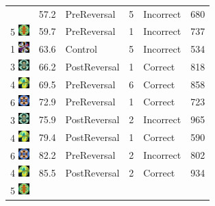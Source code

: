 \documentclass[]{article}
\begin{document}
\begin{longtable}[]{@{}lrlrll@{}}
& 57.2 & PreReversal & 5 & Incorrect & 680\tabularnewline
5
\includegraphics[width=0.16670in,height=0.16670in]{../ReversalLearning_20130621/images/abs5.jpg}
& 59.7 & PreReversal & 1 & Incorrect & 737\tabularnewline
1
\includegraphics[width=0.16670in,height=0.16670in]{../ReversalLearning_20130621/images/abs1.jpg}
& 63.6 & Control & 5 & Incorrect & 534\tabularnewline
3
\includegraphics[width=0.16670in,height=0.16670in]{../ReversalLearning_20130621/images/abs3.jpg}
& 66.2 & PostReversal & 1 & Correct & 818\tabularnewline
4
\includegraphics[width=0.16670in,height=0.16670in]{../ReversalLearning_20130621/images/abs4.jpg}
& 69.5 & PreReversal & 6 & Correct & 858\tabularnewline
6
\includegraphics[width=0.16670in,height=0.16670in]{../ReversalLearning_20130621/images/abs6.jpg}
& 72.9 & PreReversal & 1 & Correct & 723\tabularnewline
3
\includegraphics[width=0.16670in,height=0.16670in]{../ReversalLearning_20130621/images/abs3.jpg}
& 75.9 & PostReversal & 2 & Incorrect & 965\tabularnewline
4
\includegraphics[width=0.16670in,height=0.16670in]{../ReversalLearning_20130621/images/abs4.jpg}
& 79.4 & PostReversal & 1 & Correct & 590\tabularnewline
6
\includegraphics[width=0.16670in,height=0.16670in]{../ReversalLearning_20130621/images/abs6.jpg}
& 82.2 & PreReversal & 2 & Incorrect & 802\tabularnewline
4
\includegraphics[width=0.16670in,height=0.16670in]{../ReversalLearning_20130621/images/abs4.jpg}
& 85.5 & PostReversal & 2 & Correct & 934\tabularnewline
5
\includegraphics[width=0.16670in,height=0.16670in]{../ReversalLearning_20130621/images/abs5.jpg}

\end{longtable}
\end{document}
